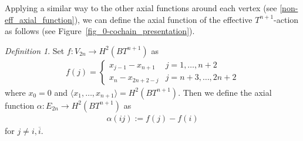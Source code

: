 \documentclass[12pt]{amsart}
\theoremstyle{remark}
\newtheorem{definition}{Definition}[section]
\numberwithin{equation}{section}
\newcommand{\algt}{\mathfrak{t}}
\begin{document}

Applying a similar way to the other axial functions around each vertex (see \eqref{non-eff_axial_function}), 
we can define the axial function of the effective $T^{n+1}$-action %
as follows (see Figure~\ref{fig_0-cochain_presentation}).
\begin{definition}
\label{effective_axial_function}
Set $f:V_{2n}\to H^{2}(BT^{n+1})$ as 
\begin{align*}
f(j)=\left\{
\begin{array}{ll}
x_{j-1}-x_{n+1} & j=1,\ldots, n+2 \\
x_{n}-x_{2n+2-j} & j=n+3,\ldots, 2n+2
\end{array}
\right.
\end{align*}
where $x_{0}=0$ and $\langle x_{1},\ldots, x_{n+1}\rangle=H^{2}(BT^{n+1})$. %
Then we define the axial function $\alpha:E_{2n}\to H^{2}(BT^{n+1})$ as  
\begin{align*}
\alpha(ij):=f(j)-f(i)
\end{align*}
for $j\not=i, \overline{i}$.
\end{definition}
\end{document}
